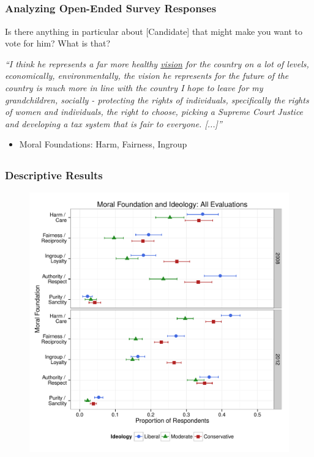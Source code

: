 \documentclass{beamer}
\begin{document}
\subsection{}
\begin{frame}%
  \frametitle{Analyzing Open-Ended Survey Responses}
\begin{exampleblock}{Is there anything in particular about [Candidate] that might make you want to vote for him? What is that?}
  \begin{center}
    \textit{``I think he represents a far more healthy \underline{vision} for the country on a lot of levels, economically, environmentally, the vision he represents for the future of the country is much more in line with the country I hope to leave for my grandchildren, socially - {\color{blue}protecting} the {\color{green}rights} of {\color{red}individuals}, specifically the {\color{green}rights} of women and {\color{red}individuals}, the right to choose, picking a Supreme Court {\color{green}Justice} and developing a tax system that is {\color{green}fair} to everyone. [...]''}
  \end{center}
\end{exampleblock}
  \begin{itemize}
  \item Moral Foundations: {\color{blue}Harm}, {\color{green}Fairness}, {\color{red}Ingroup}
  \end{itemize}
\end{frame}

\subsection{}
\begin{frame}%
  \frametitle{Descriptive Results}
  \begin{figure}[ht]\centering
    \includegraphics[height=.9\textheight]{../calc/fig/p1_mft_ideol}
  \end{figure}
\end{frame}
\end{document}
